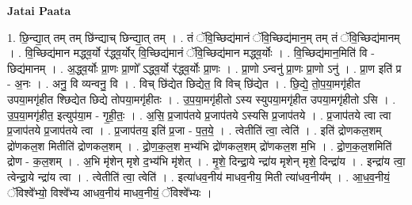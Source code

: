 \documentclass[17pt]{extarticle}
\begin{document}
\textbf{Jatai Paata} \newline

1. छि॒न्द्या॒त् तम् तम् छि॑न्द्याच् छिन्द्या॒त् तम् । . तं ॅवि॒च्छिद्य॑मानं ॅवि॒च्छिद्य॑मान॒म् तम् तं ॅवि॒च्छिद्य॑मानम् । . वि॒च्छिद्य॑मान मद्ध्व॒र्यो र॑द्ध्व॒र्योर् वि॒च्छिद्य॑मानं ॅवि॒च्छिद्य॑मान मद्ध्व॒र्योः । . वि॒च्छिद्य॑मान॒मिति॑ वि - छिद्य॑मानम् । . अ॒द्ध्व॒र्योः प्रा॒णः प्रा॒णो᳚ ऽद्ध्व॒र्यो र॑द्ध्व॒र्योः प्रा॒णः । . प्रा॒णो ऽन्वनु॑ प्रा॒णः प्रा॒णो ऽनु॑ । . प्रा॒ण इति॑ प्र - अ॒नः । . अनु॒ वि व्यन्वनु॒ वि । . विच् छि॑द्येत छिद्येत॒ वि विच् छि॑द्येत । . छि॒द्ये॒ तो॒प॒या॒मगृ॑हीत उपया॒मगृ॑हीत श्छिद्येत छिद्ये तोपया॒मगृ॑हीतः । . उ॒प॒या॒मगृ॑हीतो ऽस्य स्युपया॒मगृ॑हीत उपया॒मगृ॑हीतो ऽसि । . उ॒प॒या॒मगृ॑हीत॒ इत्युप॑या॒म - गृ॒ही॒तः॒ । . अ॒सि॒ प्र॒जाप॑तये प्र॒जाप॑तये ऽस्यसि प्र॒जाप॑तये । . प्र॒जाप॑तये त्वा त्वा प्र॒जाप॑तये प्र॒जाप॑तये त्वा । . प्र॒जाप॑तय॒ इति॑ प्र॒जा - प॒त॒ये॒ । . त्वेतीति॑ त्वा॒ त्वेति॑ । . इति॑ द्रोणकल॒शम् द्रो॑णकल॒श मितीति॑ द्रोणकल॒शम् । . द्रो॒ण॒क॒ल॒श म॒भ्य॑भि द्रो॑णकल॒शम् द्रो॑णकल॒श म॒भि । . द्रो॒ण॒क॒ल॒शमिति॑ द्रोण - क॒ल॒शम् । . अ॒भि मृ॑शेन् मृशे द॒भ्य॑भि मृ॑शेत् । . मृ॒शे॒ दिन्द्रा॒ये न्द्रा॑य मृशेन् मृशे॒ दिन्द्रा॑य । . इन्द्रा॑य त्वा॒ त्वेन्द्रा॒ये न्द्रा॑य त्वा । . त्वेतीति॑ त्वा॒ त्वेति॑ । . इत्या॑धव॒नीय॑ माधव॒नीय॒ मिती त्या॑धव॒नीय᳚म् । . आ॒ध॒व॒नीयं॒ ॅविश्वे᳚भ्यो॒ विश्वे᳚भ्य आधव॒नीय॑ माधव॒नीयं॒ ॅविश्वे᳚भ्यः । \newline
\end{document}

